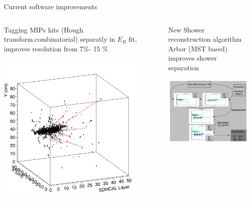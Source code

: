 \documentclass[10pt]{beamer}
\begin{document}
\begin{frame}{Current software improvements}
\begin{columns}
\begin{column}{0.5\textwidth}
  {
    \par Tagging MIPs hits (Hough transform,combinatorial) separatly in $E_R$ fit, improves resolution from 7\%- 15 \%
  }

  \centerline{\includegraphics[width=0.9\textwidth]{jpg/Beam2012Hough.jpg}}
\end{column}
\begin{column}{0.5\textwidth}
  {
    \par New Shower reconstruction algorithm Arbor (MST based) improves shower separation
  }
  \centerline{\includegraphics[width=1.15\textwidth]{jpg/Beam2012Arbor.jpg}}
\end{column}
\end{columns}

\end{frame}
\end{document}
